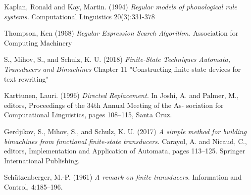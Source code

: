 \documentclass[12pt, oneside]{article}
\theoremstyle{definition}
\begin{document}
\pagebreak
\begin{thebibliography}{9}
	Kaplan, Ronald and Kay, Martin. (1994)
	\textit{Regular models of phonological rule systems.}
	Computational Linguistics 20(3):331-378

	Thompson, Ken (1968) 
	\textit{Regular Expression Search Algorithm.} 
	Association for Computing Machinery

	S., Mihov, S., and Schulz, K. U. (2018)
	\textit{Finite-State Techniques Automata, Transducers and Bimachines}
	Chapter 11 "Constructing finite-state devices for text rewriting"

	Karttunen, Lauri. (1996)
	\textit{Directed Replacement.}
	In Joshi, A. and Palmer, M., editors, Proceedings of the 34th Annual Meeting of the As- sociation for Computational Linguistics, pages 108–115, Santa Cruz.

	Gerdjikov, S., Mihov, S., and Schulz, K. U. (2017)
	\textit{A simple method for building bimachines from functional finite-state transducers.} 
	Carayol, A. and Nicaud, C., editors, Implementation and Application of Automata, pages 113–125. Springer International Publishing.

	Schützenberger, M.-P. (1961)
	\textit{A remark on finite transducers.} 
	Information and Control, 4:185–196.

\end{thebibliography}	
\end{document}
